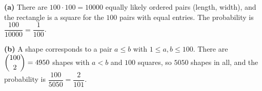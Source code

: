\textbf{(a)} There are $100\cdot100=10000$ equally likely ordered pairs (length, width), and the rectangle is a square for the $100$ pairs with equal entries. The probability is $\dfrac{100}{10000}=\boxed{\dfrac{1}{100}}$.

\textbf{(b)} A shape corresponds to a pair $a\le b$ with $1\le a,b\le100$. There are $\dbinom{100}{2}=4950$ shapes with $a<b$ and $100$ squares, so $5050$ shapes in all, and the probability is $\dfrac{100}{5050}=\boxed{\dfrac{2}{101}}$.
